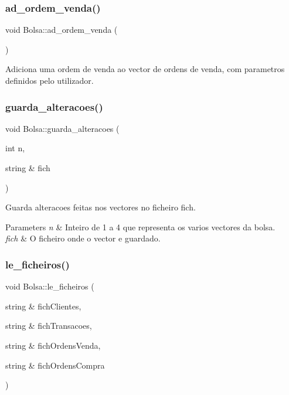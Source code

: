 \hypertarget{class_bolsa_ab028d3fd8537fa65b25c7eece82dfabc}{}\label{class_bolsa_ab028d3fd8537fa65b25c7eece82dfabc} 
\subsubsection{\texorpdfstring{ad\+\_\+ordem\+\_\+venda()}{ad\_ordem\_venda()}}
{\footnotesize\ttfamily void Bolsa\+::ad\+\_\+ordem\+\_\+venda (\begin{DoxyParamCaption}{ }\end{DoxyParamCaption})}



Adiciona uma ordem de venda ao vector de ordens de venda, com parametros definidos pelo utilizador. 

\hypertarget{class_bolsa_a12c0a8faf58b0803228ed17022c6ecfe}{}\label{class_bolsa_a12c0a8faf58b0803228ed17022c6ecfe} 
\subsubsection{\texorpdfstring{guarda\+\_\+alteracoes()}{guarda\_alteracoes()}}
{\footnotesize\ttfamily void Bolsa\+::guarda\+\_\+alteracoes (\begin{DoxyParamCaption}\item[{int}]{n,  }\item[{string \&}]{fich }\end{DoxyParamCaption})}



Guarda alteracoes feitas nos vectores no ficheiro fich. 


\begin{DoxyParams}{Parameters}
{\em n} & Inteiro de 1 a 4 que representa os varios vectores da bolsa. \\
\hline
{\em fich} & O ficheiro onde o vector e guardado. \\
\hline
\end{DoxyParams}
\hypertarget{class_bolsa_aabb97dba1ba1783fbe860058764c6a90}{}\label{class_bolsa_aabb97dba1ba1783fbe860058764c6a90} 
\subsubsection{\texorpdfstring{le\+\_\+ficheiros()}{le\_ficheiros()}}
{\footnotesize\ttfamily void Bolsa\+::le\+\_\+ficheiros (\begin{DoxyParamCaption}\item[{string \&}]{fich\+Clientes,  }\item[{string \&}]{fich\+Transacoes,  }\item[{string \&}]{fich\+Ordens\+Venda,  }\item[{string \&}]{fich\+Ordens\+Compra }\end{DoxyParamCaption})}



